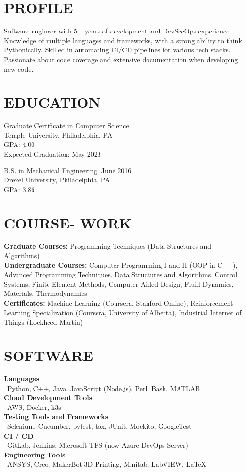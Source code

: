 \documentclass[line,resmargin,11pt]{res}
\begin{document}
\address{https://www.andygnias.com/}
\begin{resume}

\section{PROFILE}
Software engineer with 5+ years of development and DevSecOps experience. Knowledge of multiple languages and frameworks, with a strong ability to think Pythonically. 
Skilled in automating CI/CD pipelines for various tech stacks. Passionate about code coverage and extensive documentation when developing new code.
 
\section{EDUCATION}
Graduate Certificate in Computer Science \\
Temple University, Philadelphia, PA \\
GPA: 4.00 \\
Expected Graduation: May 2023

B.S. in Mechanical Engineering, June 2016 \\
Drexel University, Philadelphia, PA \\
GPA: 3.86

\section{COURSE- WORK}
	\textbf{Graduate Courses:} Programming Techniques (Data Structures and Algorithms) \\
	\textbf{Undergraduate Courses:} Computer Programming I and II (OOP in C++), Advanced Programming Techniques, Data Structures and Algorithms, Control Systems, Finite Element Methods, Computer Aided Design, Fluid Dynamics, Materials, Thermodynamics \\
	\textbf{Certificates:} Machine Learning (Coursera, Stanford Online), Reinforcement Learning Specialization (Coursera, University of Alberta), Industrial Internet of Things (Lockheed Martin)

\section{SOFTWARE}
\textbf{Languages} \\
\textbullet\ Python, C++, Java, JavaScript (Node.js), Perl, Bash, MATLAB  \\
\textbf{Cloud Development Tools} \\
\textbullet\ AWS, Docker, k3s \\
\textbf{Testing Tools and Frameworks} \\
\textbullet\ Selenium, Cucumber, pytest, tox, JUnit, Mockito, GoogleTest \\
\textbf{CI / CD} \\
\textbullet\ GitLab, Jenkins, Microsoft TFS (now Azure DevOps Server) \\
\textbf{Engineering Tools} \\
\textbullet\ ANSYS, Creo, MakerBot 3D Printing, Minitab, LabVIEW, \LaTeX        
 

\end{resume}
\end{document}
